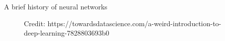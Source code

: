 \begin{vbframe}{A brief history of neural networks}
\begin{figure}
\centering
{}
\vspace{.5cm}
\tiny{Credit: https://towardsdatascience.com/a-weird-introduction-to-deep-learning-7828803693b0}
\framebreak

\end{figure}
\framebreak



\end{vbframe}

